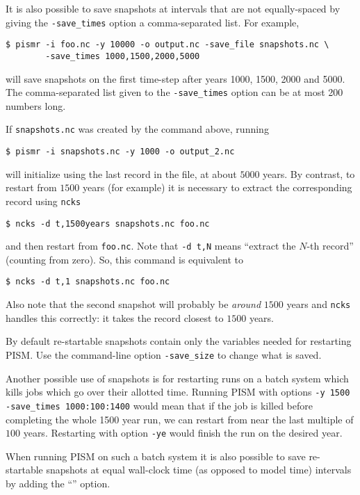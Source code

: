 It is also possible to save snapshots at intervals that are not equally-spaced
by giving the \texttt{-save_times} option a comma-separated list. For example,
\begin{verbatim}
$ pismr -i foo.nc -y 10000 -o output.nc -save_file snapshots.nc \
        -save_times 1000,1500,2000,5000
\end{verbatim}
will save snapshots on the first time-step after years 1000, 1500, 2000 and 5000.
The comma-separated list given to the \texttt{-save_times} option can be at most 200 numbers long.

If \texttt{snapshots.nc} was created by the command above, running
\begin{verbatim}
$ pismr -i snapshots.nc -y 1000 -o output_2.nc
\end{verbatim}
will initialize using the last record in the file, at about $5000$ years.  By contrast, to restart from $1500$ years (for example) it is necessary to extract the corresponding record using \texttt{ncks}
\begin{verbatim}
$ ncks -d t,1500years snapshots.nc foo.nc
\end{verbatim}
and then restart from \texttt{foo.nc}.  Note that \texttt{-d t,N} means ``extract the $N$-th record'' (counting from zero).  So, this command is equivalent to
\begin{verbatim}
$ ncks -d t,1 snapshots.nc foo.nc
\end{verbatim}
Also note that the second snapshot will probably be \emph{around} $1500$ years and \texttt{ncks} handles this correctly: it takes the record closest to $1500$ years.

By default re-startable snapshots contain only the variables needed for
restarting PISM. Use the command-line option \texttt{-save_size} to change what is saved.

Another possible use of snapshots is for restarting runs on a batch system which kills jobs which go over their allotted time.  Running PISM with options \texttt{-y 1500} \texttt{-save_times 1000:100:1400} would mean that if the job is killed before completing the whole 1500 year run, we can restart from near the last multiple of $100$ years.  Restarting with option \texttt{-ye} would finish the run on the desired year.

When running PISM on such a batch system it is also possible to save
re-startable snapshots at equal wall-clock time (as opposed to model time)
intervals by adding the ``\txtopt{backup_interval}{hours}'' option.

